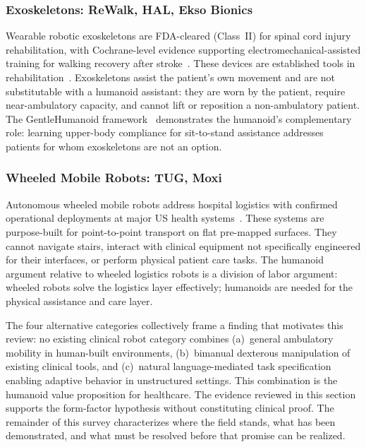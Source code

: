 \documentclass[acmjour]{acmart}
\begin{document}
\subsubsection{Exoskeletons: ReWalk, HAL, Ekso Bionics}

Wearable robotic exoskeletons are FDA-cleared (Class~II) for spinal cord injury
rehabilitation, with Cochrane-level evidence supporting electromechanical-assisted
training for walking recovery after stroke~\cite{mehrholz2017electromechanical}.
These devices are established tools in rehabilitation~\cite{sorensen2025humanoid}. Exoskeletons assist the patient's own
movement and are not substitutable with a humanoid assistant: they are worn by
the patient, require near-ambulatory capacity, and cannot lift or reposition a
non-ambulatory patient. The GentleHumanoid framework~\cite{lu2025gentlehumanoid}
demonstrates the humanoid's complementary role: learning upper-body compliance
for sit-to-stand assistance addresses patients for whom exoskeletons are not an
option.

\subsubsection{Wheeled Mobile Robots: TUG, Moxi}

Autonomous wheeled mobile robots address hospital logistics with confirmed
operational deployments at major US health systems~\cite{huang2023intelligent,morgan2022robots}.
These systems are purpose-built for point-to-point transport on flat pre-mapped
surfaces. They cannot navigate stairs, interact with clinical equipment not
specifically engineered for their interfaces, or perform physical patient care
tasks. The humanoid argument relative to wheeled logistics robots is a division
of labor argument: wheeled robots solve the logistics layer effectively;
humanoids are needed for the physical assistance and care layer.

The four alternative categories collectively frame a finding that motivates this
review: no existing clinical robot category combines (a)~general ambulatory
mobility in human-built environments, (b)~bimanual dexterous manipulation of
existing clinical tools, and (c)~natural language-mediated task specification
enabling adaptive behavior in unstructured settings. This combination is the
humanoid value proposition for healthcare. The evidence reviewed in this section
supports the form-factor hypothesis without constituting clinical proof. The
remainder of this survey characterizes where the field stands, what has been
demonstrated, and what must be resolved before that promise can be realized.
\end{document}
